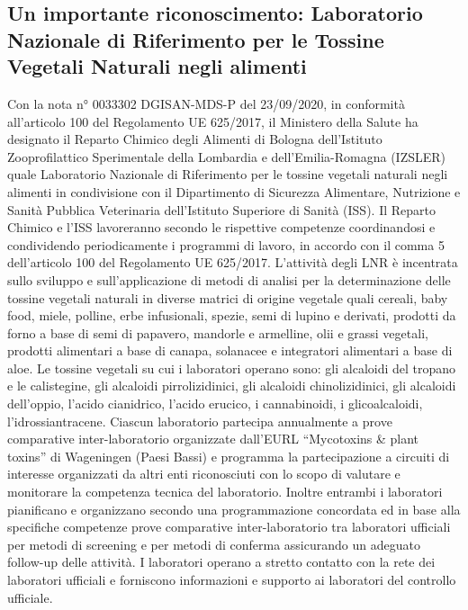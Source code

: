 \documentclass[
  12pt,
]{article}
\begin{document}
\hypertarget{un-importante-riconoscimento-laboratorio-nazionale-di-riferimento-per-le-tossine-vegetali-naturali-negli-alimenti}{%
\subsection{Un importante riconoscimento: Laboratorio Nazionale di
Riferimento per le Tossine Vegetali Naturali negli
alimenti}\label{un-importante-riconoscimento-laboratorio-nazionale-di-riferimento-per-le-tossine-vegetali-naturali-negli-alimenti}}

Con la nota n° 0033302 DGISAN-MDS-P del 23/09/2020, in conformità
all'articolo 100 del Regolamento UE 625/2017, il Ministero della Salute
ha designato il Reparto Chimico degli Alimenti di Bologna dell'Istituto
Zooprofilattico Sperimentale della Lombardia e dell'Emilia-Romagna
(IZSLER) quale Laboratorio Nazionale di Riferimento per le tossine
vegetali naturali negli alimenti in condivisione con il Dipartimento di
Sicurezza Alimentare, Nutrizione e Sanità Pubblica Veterinaria
dell'Istituto Superiore di Sanità (ISS). Il Reparto Chimico e l'ISS
lavoreranno secondo le rispettive competenze coordinandosi e
condividendo periodicamente i programmi di lavoro, in accordo con il
comma 5 dell'articolo 100 del Regolamento UE 625/2017. L'attività degli
LNR è incentrata sullo sviluppo e sull'applicazione di metodi di analisi
per la determinazione delle tossine vegetali naturali in diverse matrici
di origine vegetale quali cereali, baby food, miele, polline, erbe
infusionali, spezie, semi di lupino e derivati, prodotti da forno a base
di semi di papavero, mandorle e armelline, olii e grassi vegetali,
prodotti alimentari a base di canapa, solanacee e integratori alimentari
a base di aloe. Le tossine vegetali su cui i laboratori operano sono:
gli alcaloidi del tropano e le calistegine, gli alcaloidi
pirrolizidinici, gli alcaloidi chinolizidinici, gli alcaloidi
dell'oppio, l'acido cianidrico, l'acido erucico, i cannabinoidi, i
glicoalcaloidi, l'idrossiantracene. Ciascun laboratorio partecipa
annualmente a prove comparative inter-laboratorio organizzate dall'EURL
``Mycotoxins \& plant toxins'' di Wageningen (Paesi Bassi) e programma
la partecipazione a circuiti di interesse organizzati da altri enti
riconosciuti con lo scopo di valutare e monitorare la competenza tecnica
del laboratorio. Inoltre entrambi i laboratori pianificano e organizzano
secondo una programmazione concordata ed in base alla specifiche
competenze prove comparative inter-laboratorio tra laboratori ufficiali
per metodi di screening e per metodi di conferma assicurando un adeguato
follow-up delle attività. I laboratori operano a stretto contatto con la
rete dei laboratori ufficiali e forniscono informazioni e supporto ai
laboratori del controllo ufficiale.
\end{document}
